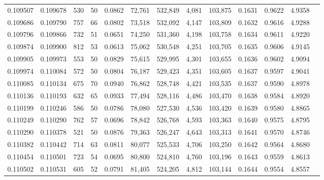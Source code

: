 \begin{tabular}{rrrrrrrrrrrrr}
0.109507 & 0.109678 &   530 &  50 &                                     0.0862 &  72,761 & 532,849 &   4,081 & 103,875 & 0.1631 & 0.9622 & 4.9358 \\
0.109686 & 0.109790 &   757 &  66 &                                     0.0802 &  73,518 & 532,092 &   4,147 & 103,809 & 0.1632 & 0.9616 & 4.9288 \\
0.109796 & 0.109866 &   732 &  51 &                                     0.0651 &  74,250 & 531,360 &   4,198 & 103,758 & 0.1634 & 0.9611 & 4.9220 \\
0.109874 & 0.109900 &   812 &  53 &                                     0.0613 &  75,062 & 530,548 &   4,251 & 103,705 & 0.1635 & 0.9606 & 4.9145 \\
0.109905 & 0.109973 &   553 &  50 &                                     0.0829 &  75,615 & 529,995 &   4,301 & 103,655 & 0.1636 & 0.9602 & 4.9094 \\
0.109974 & 0.110084 &   572 &  50 &                                     0.0804 &  76,187 & 529,423 &   4,351 & 103,605 & 0.1637 & 0.9597 & 4.9041 \\
0.110085 & 0.110134 &   675 &  70 &                                     0.0940 &  76,862 & 528,748 &   4,421 & 103,535 & 0.1637 & 0.9590 & 4.8978 \\
0.110136 & 0.110193 &   632 &  65 &                                     0.0933 &  77,494 & 528,116 &   4,486 & 103,470 & 0.1638 & 0.9584 & 4.8920 \\
0.110199 & 0.110246 &   586 &  50 &                                     0.0786 &  78,080 & 527,530 &   4,536 & 103,420 & 0.1639 & 0.9580 & 4.8865 \\
0.110249 & 0.110290 &   762 &  57 &                                     0.0696 &  78,842 & 526,768 &   4,593 & 103,363 & 0.1640 & 0.9575 & 4.8795 \\
0.110290 & 0.110378 &   521 &  50 &                                     0.0876 &  79,363 & 526,247 &   4,643 & 103,313 & 0.1641 & 0.9570 & 4.8746 \\
0.110382 & 0.110442 &   714 &  63 &                                     0.0811 &  80,077 & 525,533 &   4,706 & 103,250 & 0.1642 & 0.9564 & 4.8680 \\
0.110454 & 0.110501 &   723 &  54 &                                     0.0695 &  80,800 & 524,810 &   4,760 & 103,196 & 0.1643 & 0.9559 & 4.8613 \\
0.110502 & 0.110531 &   605 &  52 &                                     0.0791 &  81,405 & 524,205 &   4,812 & 103,144 & 0.1644 & 0.9554 & 4.8557 \\

\end{tabular}
